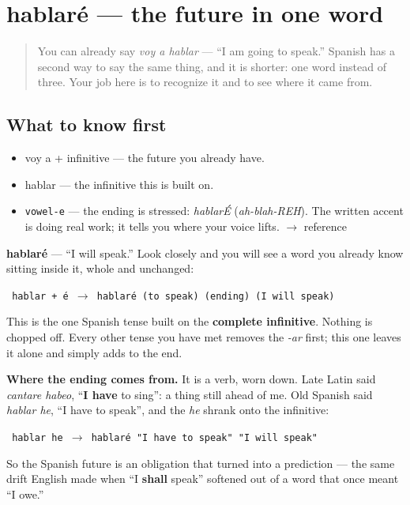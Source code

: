 \section[hablaré]{hablaré — the future in one word}

\label{lesson:ES-C10-futuro-simple}



\begin{quote}
You can already say \emph{voy a hablar} — \textquotedblleft{}I am going to speak.\textquotedblright{} Spanish has a second way to say the same thing, and it is shorter: one word instead of three. Your job here is to recognize it and to see where it came from.
\end{quote}

\subsection*{What to know first}
\begin{itemize}
\raggedright
  \item voy a + infinitive — the future you already have.
  \item hablar — the infinitive this is built on.
\end{itemize}

\begin{sounds}
\begin{itemize}
\raggedright
  \item \texttt{vowel-e} — the ending is stressed: \emph{hablarÉ} (\emph{ah-blah-REH}). The written accent is doing real work; it tells you where your voice lifts. $\to$ reference
\end{itemize}
\end{sounds}

\begin{cousinweb}
\textbf{hablaré} — \textquotedblleft{}I will speak.\textquotedblright{} Look closely and you will see a word you already know sitting inside it, whole and unchanged:

\texttt{}\texttt{ hablar   +   é      $\to$   hablaré (to speak)   (ending)     (I will speak) }\texttt{}

This is the one Spanish tense built on the \textbf{complete infinitive}. Nothing is chopped off. Every other tense you have met removes the \emph{-ar} first; this one leaves it alone and simply adds to the end.

\textbf{Where the ending comes from.} It is a verb, worn down. Late Latin said \emph{cantare habeo}, \textquotedblleft{}\textbf{I have} to sing\textquotedblright{}: a thing still ahead of me. Old Spanish said \emph{hablar he}, \textquotedblleft{}I have to speak\textquotedblright{}, and the \emph{he} shrank onto the infinitive:

\texttt{}\texttt{ hablar he          $\to$   hablaré "I have to speak"       "I will speak" }\texttt{}

So the Spanish future is an obligation that turned into a prediction — the same drift English made when \textquotedblleft{}I \textbf{shall} speak\textquotedblright{} softened out of a word that once meant \textquotedblleft{}I owe.\textquotedblright{}
\end{cousinweb}

